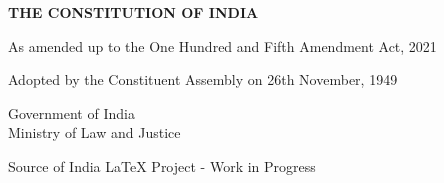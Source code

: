 \documentclass[a4paper,showamendments]{soi}
\begin{document}
\begin{titlepage}
    \centering
    \vspace*{2cm}
    
    {\Huge\bfseries THE CONSTITUTION OF INDIA}
    
    \vspace{1cm}
    {\Large As amended up to the One Hundred and Fifth Amendment Act, 2021}
    
    \vspace{2cm}
    {\large Adopted by the Constituent Assembly on 26th November, 1949}
    
    \vfill
    
    {\large Government of India\\Ministry of Law and Justice}
    
    \vspace{1cm}
    {\normalsize Source of India LaTeX Project - Work in Progress}
\end{titlepage}










\clearpage



\end{document}
